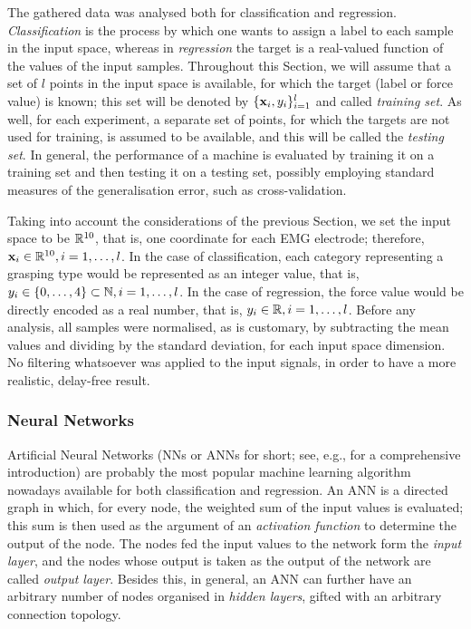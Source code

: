 The gathered data was analysed both for classification and
regression. \emph{Classification} is the process by which one wants to
assign a label to each sample in the input space, whereas in
\emph{regression} the target is a real-valued function of the values
of the input samples. Throughout this Section, we will assume that a
set of $l$ points in the input space is available, for which the
target (label or force value) is known; this set will be denoted by
$\{\mathbf{x}_i,y_i\}_{i=1}^l$ and called \emph{training set}. As well, for
each experiment, a separate set of points, for which the targets are
not used for training, is assumed to be available, and this will be
called the \emph{testing set}. In general, the performance of a
machine is evaluated by training it on a training set and then testing
it on a testing set, possibly employing standard measures of the
generalisation error, such as cross-validation.

Taking into account the considerations of the previous Section, we set
the input space to be $\mathbb{R}^{10}$, that is, one coordinate for each EMG
electrode; therefore, $\mathbf{x}_i \in \mathbb{R}^{10}, i=1,\ldots,l$. In the case
of classification, each category representing a grasping type would be
represented as an integer value, that is, $y_i \in \{0,\ldots,4\}
\subset \mathbb{N}, i=1,\ldots,l$. In the case of regression, the force value
would be directly encoded as a real number, that is, $y_i \in \mathbb{R},
i=1,\ldots,l$. Before any analysis, all samples were normalised, as is
customary, by subtracting the mean values and dividing by the standard
deviation, for each input space dimension. No filtering whatsoever was
applied to the input signals, in order to have a more realistic,
delay-free result.

\subsubsection{Neural Networks}

Artificial Neural Networks (NNs or ANNs for short; see, e.g.,
\cite{bishop} for a comprehensive introduction) are probably the most
popular machine learning algorithm nowadays available for both
classification and regression. An ANN is a directed graph in which,
for every node, the weighted sum of the input values is evaluated;
this sum is then used as the argument of an \emph{activation function}
to determine the output of the node. The nodes fed the input values to
the network form the \emph{input layer}, and the nodes whose output is
taken as the output of the network are called \emph{output
layer}. Besides this, in general, an ANN can further have an arbitrary
number of nodes organised in \emph{hidden layers}, gifted with an
arbitrary connection topology.

